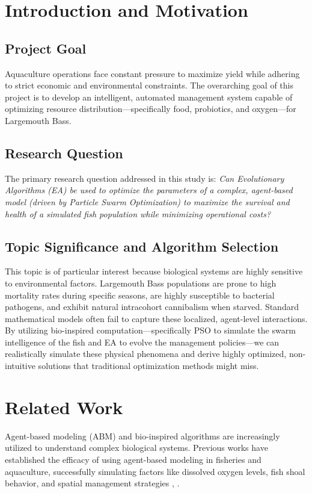 \documentclass[conference]{IEEEtran}
\begin{document}
\section{Introduction and Motivation}

\subsection{Project Goal}
Aquaculture operations face constant pressure to maximize yield while adhering to strict economic and environmental constraints. The overarching goal of this project is to develop an intelligent, automated management system capable of optimizing resource distribution---specifically food, probiotics, and oxygen---for Largemouth Bass.

\subsection{Research Question}
The primary research question addressed in this study is: \textit{Can Evolutionary Algorithms (EA) be used to optimize the parameters of a complex, agent-based model (driven by Particle Swarm Optimization) to maximize the survival and health of a simulated fish population while minimizing operational costs?}

\subsection{Topic Significance and Algorithm Selection}
This topic is of particular interest because biological systems are highly sensitive to environmental factors. Largemouth Bass populations are prone to high mortality rates during specific seasons, are highly susceptible to bacterial pathogens, and exhibit natural intracohort cannibalism when starved. Standard mathematical models often fail to capture these localized, agent-level interactions. By utilizing bio-inspired computation---specifically PSO to simulate the swarm intelligence of the fish and EA to evolve the management policies---we can realistically simulate these physical phenomena and derive highly optimized, non-intuitive solutions that traditional optimization methods might miss.

\section{Related Work}
Agent-based modeling (ABM) and bio-inspired algorithms are increasingly utilized to understand complex biological systems. Previous works have established the efficacy of using agent-based modeling in fisheries and aquaculture, successfully simulating factors like dissolved oxygen levels, fish shoal behavior, and spatial management strategies \cite{smith2024}, \cite{doe2023}.
\end{document}
